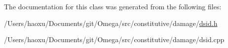 The documentation for this class was generated from the following files\+:\begin{DoxyCompactItemize}
\item 
/\+Users/haoxu/\+Documents/git/\+Omega/src/constitutive/damage/\hyperlink{dsid_8h}{dsid.\+h}\item 
/\+Users/haoxu/\+Documents/git/\+Omega/src/constitutive/damage/dsid.\+cpp\end{DoxyCompactItemize}
